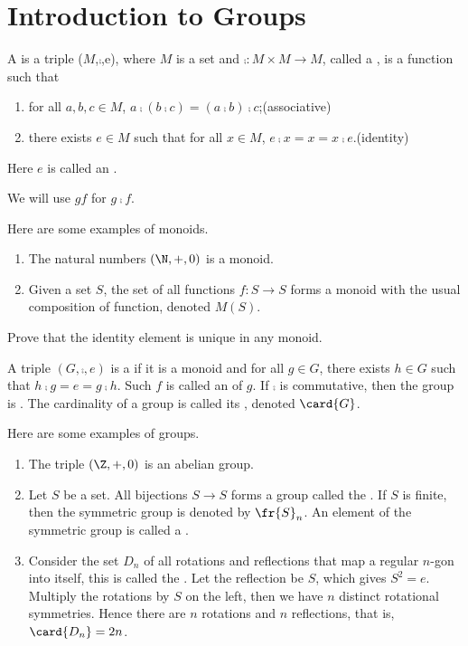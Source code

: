 \documentclass[10pt]{article}
\begin{document}
\newpage


\section{Introduction to Groups}
\begin{definition}
    A  is a triple ($M$,$\comp$,e), where $M$ is a set and $\comp:M\times M\to M$, called a , is a function such that
    \begin{enumerate}
        \item for all $a,b,c\in M$, $a\comp(b\comp c)=(a\comp b)\comp c$;\hfill(associative)
        \item there exists $e\in M$ such that for all $x\in M$, $e\comp x=x=x\comp e$.\hfill(identity)
    \end{enumerate}
    Here $e$ is called an .
\end{definition}
\begin{remark}
    We will use $gf$ for $g\comp f$.
\end{remark}
\begin{example}
    Here are some examples of monoids.
    \begin{enumerate}
        \item The natural numbers $(\N,+,0)$ is a monoid.
        \item Given a set $S$, the set of all functions $f:S\to S$ forms a monoid with the usual composition of function, denoted $M(S)$.
    \end{enumerate}
\end{example}
\begin{problem}
    Prove that the identity element is unique in any monoid.
\end{problem}
\begin{definition}
    A triple $(G,\comp,e)$ is a  if it is a monoid and for all $g\in G$, there exists $h\in G$ such that $h\comp g=e=g\comp h$. Such $f$ is called an  of $g$. If $\comp$ is commutative, then the group is . The cardinality of a group is called its , denoted $\card{G}$.
\end{definition}
\begin{example}
    Here are some examples of groups.
    \begin{enumerate}
        \item The triple $(\Z,+,0)$ is an abelian group.
        \item Let $S$ be a set. All bijections $S\to S$ forms a group called the . If $S$ is finite, then the symmetric group is denoted by ${\fr{S}}_{n}$. An element of the symmetric group is called a .
        \item Consider the set ${D}_{n}$ of all rotations and reflections that map a regular $n$-gon into itself, this is called the . Let the reflection be $S$, which gives ${S}^{2}=e$. Multiply the rotations by $S$ on the left, then we have $n$ distinct rotational symmetries. Hence there are $n$ rotations and $n$ reflections, that is, $\card{{D}_{n}}=2n$.
    \end{enumerate}    
\end{example}
\end{document}
